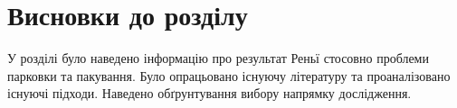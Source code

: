 \section*{Висновки до розділу}
У розділі було наведено інформацію про результат Реньї стосовно проблеми парковки та пакування. Було опрацьовано існуючу літературу та проаналізовано існуючі підходи. Наведено обґрунтування вибору напрямку дослідження.
